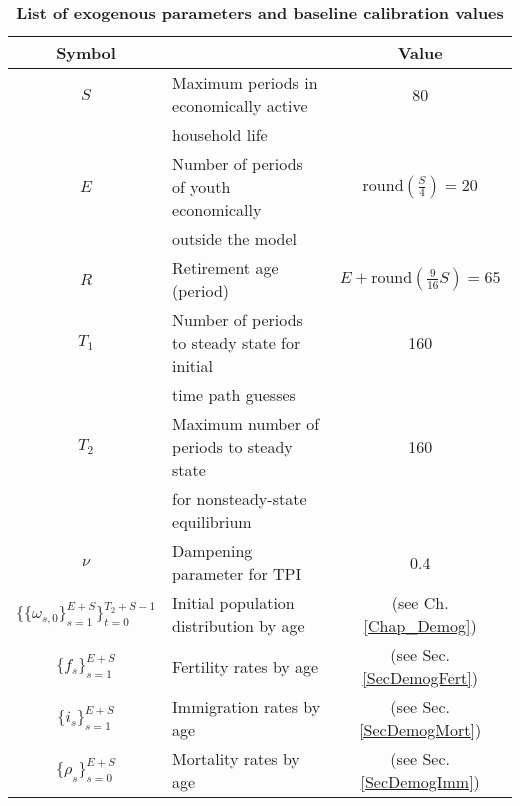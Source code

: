   \begin{table}[htbp] \centering \captionsetup{width=4.7in}
    \caption{\label{TabExogVars}\textbf{List of exogenous parameters and baseline calibration values}}
      \begin{threeparttable}
      \begin{tabular}{>{\footnotesize}c |>{\footnotesize}l |>{\footnotesize}c}
        \hline\hline
        Symbol & \multicolumn{1}{c}{\footnotesize{Description}} & Value \\
        \hline
        $S$ & Maximum periods in economically active & 80 \\[-1.5mm]
        & \quad household life & \\
        $E$ & Number of periods of youth economically & $\text{round}\left(\frac{S}{4}\right)=20$ \\[-1.5mm]
        & \quad outside the model & \\
        $R$ & Retirement age (period) & $E+\text{round}\left(\frac{9}{16}S\right)=65$ \\
        $T_1$ & Number of periods to steady state for initial & 160 \\[-1.5mm]
        & \quad time path guesses & \\
        $T_2$ & Maximum number of periods to steady state & 160 \\[-1.5mm]
        & \quad for nonsteady-state equilibrium & \\
        $\nu$ & Dampening parameter for TPI & 0.4 \\
        \hline
        $\{\{\omega_{s,0}\}_{s=1}^{E+S}\}_{t=0}^{T_2+S-1}$ & Initial population distribution by age & (see Ch. \ref{Chap_Demog}) \\
        $\{f_s\}_{s=1}^{E+S}$ & Fertility rates by age & (see Sec. \ref{SecDemogFert}) \\
        $\{i_s\}_{s=1}^{E+S}$ & Immigration rates by age & (see Sec. \ref{SecDemogMort}) \\
        $\{\rho_s\}_{s=0}^{E+S}$ & Mortality rates by age & (see Sec. \ref{SecDemogImm}) \\




\end{tabular}
\end{threeparttable}
\end{table}

